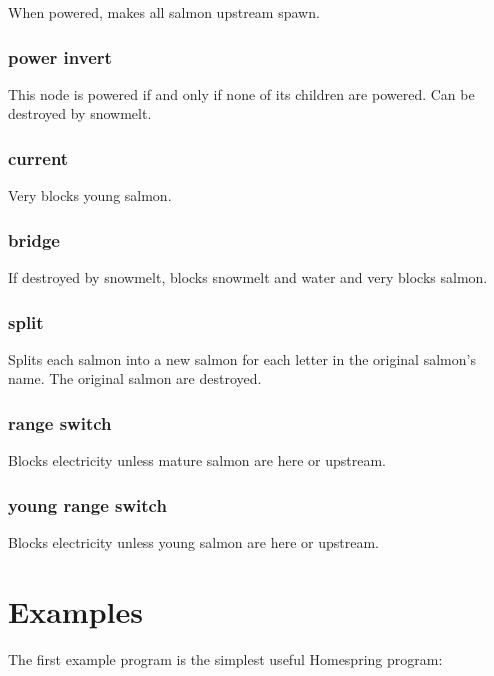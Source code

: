 \documentclass[10pt]{article}
\begin{document}
When powered, makes all salmon upstream spawn.

\subsubsection{power invert}

This node is powered if and only if none of its children are powered. Can be destroyed by snowmelt.

\subsubsection{current}

Very blocks young salmon.

\subsubsection{bridge}

If destroyed by snowmelt, blocks snowmelt and water and very blocks salmon.

\subsubsection{split}

Splits each salmon into a new salmon for each letter in the original salmon's name. The original salmon are destroyed.

\subsubsection{range switch}

Blocks electricity unless mature salmon are here or upstream.

\subsubsection{young range switch}

Blocks electricity unless young salmon are here or upstream.

\section{Examples}

The first example program is the simplest useful Homespring program:

\begin{verbatim*}

\end{verbatim*}
\end{document}
